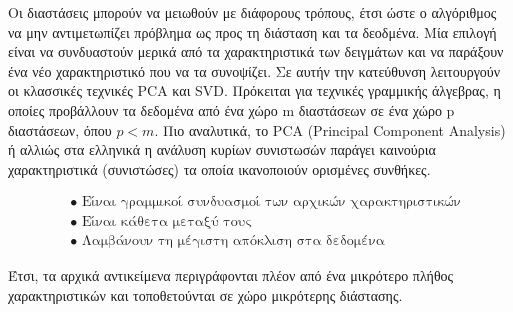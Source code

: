 \documentclass[12pt]{article}
\begin{document}
Οι διαστάσεις μπορούν να μειωθούν με διάφορους τρόπους, έτσι ώστε ο αλγόριθμος να μην αντιμετωπίζει πρόβλημα ως προς τη διάσταση και τα δεοδμένα. Μία επιλογή είναι να συνδυαστούν μερικά από τα χαρακτηριστικά των δειγμάτων και να παράξουν ένα νέο χαρακτηριστικό που να τα συνοψίζει. Σε αυτήν την κατεύθυνση λειτουργούν οι κλασσικές τεχνικές PCA και SVD. Πρόκειται για τεχνικές γραμμικής άλγεβρας, η οποίες προβάλλουν τα δεδομένα από ένα χώρο m διαστάσεων σε ένα χώρο p διαστάσεων, όπου \(p < m\). Πιο αναλυτικά, το PCA (Principal Component Analysis) ή αλλιώς στα ελληνικά η ανάλυση κυρίων συνιστωσών παράγει καινούρια χαρακτηριστικά (συνιστώσες) τα οποία ικανοποιούν ορισμένες συνθήκες. 

\begin{align*}
	& \bullet \text{ Είναι γραμμικοί συνδυασμοί των αρχικών χαρακτηριστικών} \\
	& \bullet \text{ Είναι κάθετα μεταξύ τους} \\
	& \bullet \text{ Λαμβάνουν τη μέγιστη απόκλιση στα δεδομένα}
\end{align*} 

Έτσι, τα αρχικά αντικείμενα περιγράφονται πλέον από ένα μικρότερο πλήθος χαρακτηριστικών και τοποθετούνται σε χώρο μικρότερης διάστασης. \\
\end{document}
